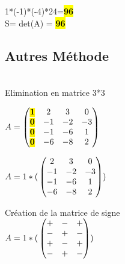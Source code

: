 \vspace{5mm} %

1*(-1)*(-4)*24=\hl{\textbf{96}} \\
\vspace{4mm} %
S= det(A) = \hl{\textbf{96}} \\

\subsection{Autres Méthode} \\

Elimination en matrice 3*3 \\

\vspace{5mm} %

$
A =
\begin{pmatrix}
  \hl{\textbf{1}} & 2 & 3 & 0   \\
  \hl{\textbf{0}} & -1 & -2 & -3   \\
  \hl{\textbf{0}} & -1 & -6 & 1 \\
  \hl{\textbf{0}} & -6 & -8 & 2 \\
\end{pmatrix}
$

\vspace{5mm} %

$
A = 1*( \\
  \begin{pmatrix}
     2 & 3 & 0   \\
    -1 & -2 & -3 \\
    -1 & -6 & 1  \\
    -6 & -8 & 2  \\
  \end{pmatrix}
)\\
$

\vspace{5mm} %

Création de la matrice de signe \\

$
A = 1*( \\
  \begin{pmatrix}
    + & - & +  \\
    - & + & -  \\
    + & - & +  \\
    - & + & -  \\
  \end{pmatrix}
)\\
$


